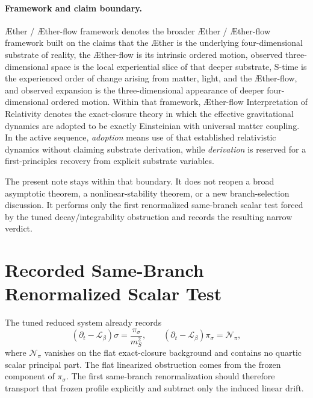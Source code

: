 \documentclass[11pt]{article}
\newcommand{\Aether}{\AE{}ther}
\newcommand{\Aflow}{\AE{}ther-flow}
\newcommand{\TheoryName}{\Aflow{} Interpretation of Relativity}
\newcommand{\TheoryProgram}{\Aether{} / \Aflow{} framework}
\newcommand{\Ell}{\mathcal{L}}
\begin{document}
\paragraph{Framework and claim boundary.}
\TheoryProgram{} denotes the broader \Aether{} / \Aflow{} framework built on the claims that the \Aether{} is the underlying four-dimensional substrate of reality, the \Aflow{} is its intrinsic ordered motion, observed three-dimensional space is the local experiential slice of that deeper substrate, S-time is the experienced order of change arising from matter, light, and the \Aflow{}, and observed expansion is the three-dimensional appearance of deeper four-dimensional ordered motion. Within that framework, \TheoryName{} denotes the exact-closure theory in which the effective gravitational dynamics are adopted to be exactly Einsteinian with universal matter coupling. In the active sequence, \emph{adoption} means use of that established relativistic dynamics without claiming substrate derivation, while \emph{derivation} is reserved for a first-principles recovery from explicit substrate variables.

The present note stays within that boundary. It does not reopen a broad asymptotic theorem, a nonlinear-stability theorem, or a new branch-selection discussion. It performs only the first renormalized same-branch scalar test forced by the tuned decay/integrability obstruction and records the resulting narrow verdict.

\section{Recorded Same-Branch Renormalized Scalar Test}

The tuned reduced system already records
\begin{equation}
(\partial_t-\Ell_\beta)\sigma
=
\frac{\pi_\sigma}{m_S^2},
\qquad
(\partial_t-\Ell_\beta)\pi_\sigma
=
\mathcal N_\pi,
\label{eq:tunedscalar}
\end{equation}
where \(\mathcal N_\pi\) vanishes on the flat exact-closure background and contains no quartic scalar principal part. The flat linearized obstruction comes from the frozen component of \(\pi_\sigma\). The first same-branch renormalization should therefore transport that frozen profile explicitly and subtract only the induced linear drift.
\end{document}
